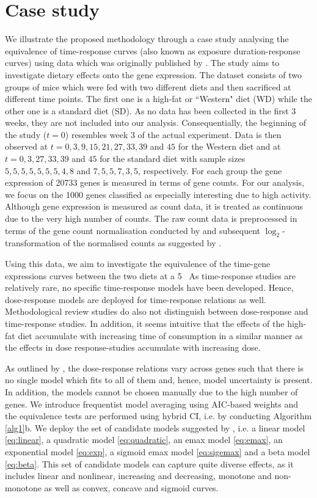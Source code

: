 {\section{Case study} \label{sec:case}
We illustrate the proposed methodology through a case study analysing the equivalence of time-response curves (also known as exposure duration-response curves) using data which was originally published by \citet{Ghallab2021}. The study aims to investigate dietary effects onto the gene expression.
The dataset consists of two groups of mice which were fed with two different diets and then sacrificed at different time points. The first one is a high-fat or ``Western" diet (WD) while the other one is a standard diet (SD). As no data has been collected in the first 3 weeks, they are not included into our analysis. Consequentially, the beginning of the study ($t=0$) resembles week 3 of the actual experiment.
Data is then observed at $t=0, 3, 9, 15, 21, 27, 33, 39$ and $45$ for the Western diet and at $t=0, 3, 27, 33, 39$ and $45$ for the standard diet with sample sizes $5, 5, 5, 5, 5, 5, 5, 4, 8$
and $7, 5, 5, 7, 3, 5$, respectively. 
For each group the gene expression of 20733 genes is measured in terms of gene counts. For our analysis, we focus on the 1000 genes \citet{Ghallab2021} classified as especially interesting due to high activity. 
Although gene expression is measured as count data, it is treated as continuous due to the very high number of counts. The raw count data is preprocessed in terms of the gene count normalisation conducted by \citet{Ghallab2021} and subsequent $\log_2$-transformation of the normalised counts as suggested by \citet{Duda2022, Duda2023}.

Using this data, we aim to investigate the equivalence of the time-gene expressions curves between the two diets at a 5 \
As time-response studies are relatively rare, no specific time-response models have been developed. Hence, dose-response models are deployed for time-response relations as well. Methodological review studies \citep[e.g.][]{Kappenberg2023} do also not distinguish between dose-response and time-response studies. In addition, it seems intuitive that the effects of the high-fat diet accumulate with increasing time of consumption in a similar manner as the effects in dose response-studies accumulate with increasing dose. 

As outlined by \citet{Ghallab2021}, the dose-response relations vary across genes such that there is no single model which fits to all of them and, hence, model uncertainty is present. In addition, the models cannot be chosen manually due to the high number of genes. 
We introduce frequentist model averaging using AIC-based weights and the equivalence tests are performed using hybrid CI, i.e. by conducting Algorithm \ref{alg1}b. 
We deploy the set of candidate models suggested by \citet{Duda2022}, i.e. a linear model \eqref{eq:linear}, a quadratic model \eqref{eq:quadratic}, an emax model \eqref{eq:emax}, an exponential model \eqref{eq:exp}, a sigmoid emax model \eqref{eq:sigemax} and a beta model \eqref{eq:beta}. This set of candidate models can capture quite diverse effects, as it includes linear and nonlinear, increasing and decreasing, monotone and non-monotone as well as convex, concave and sigmoid curves. 


}
